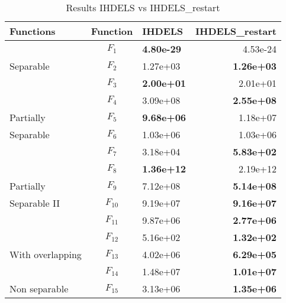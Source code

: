 \begin{table}
  \centering
\caption{Results IHDELS vs IHDELS\_restart}
    \begin{tabular}{lclr}
\toprule
Functions & Function & IHDELS & IHDELS_restart\\
\midrule
                   & $F_1$    & \textbf{4.80e-29} & 4.53e-24  \\
Separable         & $F_2$    & 1.27e+03          & \textbf{1.26e+03}  \\
                   & $F_3$    & \textbf{2.00e+01} & 2.01e+01  \\
\midrule
                   & $F_4$    & 3.09e+08          & \textbf{2.55e+08}  \\
Partially & $F_5$    & \textbf{9.68e+06} & 1.18e+07  \\
Separable         & $F_6$    & 1.03e+06          & 1.03e+06  \\
                   & $F_7$    & 3.18e+04          & \textbf{5.83e+02}  \\
\midrule
                   & $F_8$    & \textbf{1.36e+12} & 2.19e+12  \\
Partially & $F_{9}$  & 7.12e+08          & \textbf{5.14e+08}  \\
Separable II      & $F_{10}$ & 9.19e+07          & \textbf{9.16e+07}  \\
                   & $F_{11}$ & 9.87e+06          & \textbf{2.77e+06}  \\
\midrule
                   & $F_{12}$ & 5.16e+02          & \textbf{1.32e+02}  \\
With overlapping & $F_{13}$ & 4.02e+06          & \textbf{6.29e+05}  \\
                   & $F_{14}$ & 1.48e+07          & \textbf{1.01e+07}  \\
\midrule
Non separable       & $F_{15}$ & 3.13e+06          & \textbf{1.35e+06}  \\
\bottomrule
    \end{tabular}
\end{table}
